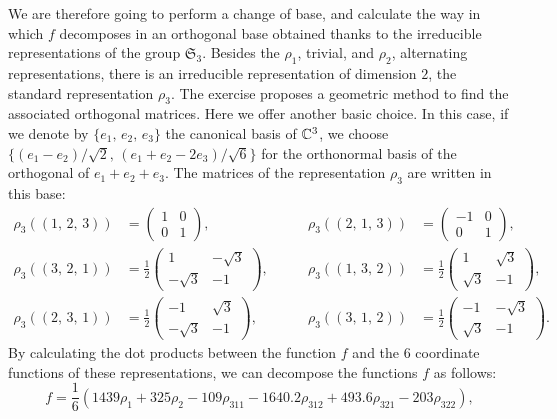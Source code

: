  
We are therefore going to perform a change of base, and calculate the way in which $ f $ decomposes in an orthogonal base obtained thanks to the irreducible representations of the group $ \mathfrak{S}_3 $. Besides the $ \rho_1 $, trivial, and $ \rho_2 $, alternating representations, there is an irreducible representation of dimension $ 2 $, the standard representation $ \rho_3 $. The exercise  proposes a geometric method to find the associated orthogonal matrices. Here we offer another basic choice. In this case, if we denote by $ \{e_1, \, e_2, \, e_3\} $ the canonical basis of $ \mathbb{C}^3 $, we choose $ \{(e_1-e_2) / \sqrt{2} , \, (e_1 + e_2-2 e_3) / \sqrt{6}\} $ for the orthonormal basis of the orthogonal of $ e_1 + e_2 + e_3 $. The matrices of the representation $ \rho_3 $ are written in this base:
\begin{align*}
\rho_3 ((1, \, 2, \, 3)) & = \begin{pmatrix} 1 & 0 \\0 & 1 \end{pmatrix}, \quad \quad & \rho_3 ((2, \, 1, \, 3)) & = \begin{pmatrix} -1 & 0 \\0 & 1 \end{pmatrix}, \\
\rho_3 ((3, \, 2, \, 1)) & = \frac{1}{2} \begin{pmatrix} 1 & - \sqrt{3} \\- \sqrt{3} & -1 \end{pmatrix}, \quad \quad & \rho_3 ((1, \, 3, \, 2)) & = \frac{1}{2} \begin{pmatrix} 1 & \sqrt{3} \\\sqrt{3} & -1 \end{pmatrix}, \\
\rho_3 ((2, \, 3, \, 1)) & = \frac{1}{2} \begin{pmatrix} -1 & \sqrt{3} \\- \sqrt{3} & -1 \end{pmatrix}, \quad \quad & \rho_3 ((3, \, 1, \, 2)) & = \frac{1}{2} \begin{pmatrix} -1 & - \sqrt{3} \\\sqrt{3} & -1 \end{pmatrix}.
\end{align*}
By calculating the dot products between the function $ f $ and the $ 6 $ coordinate functions of these representations, we can decompose the functions $ f $ as follows:
\begin{equation*}
f = \frac{1}{6} \left(1439 \rho_1 + 325 \rho_2 - 109 \rho_{311} - 1640.2 \rho_{312} + 493.6 \rho_{321} - 203 \rho_{322} \right),
\end{equation*}
